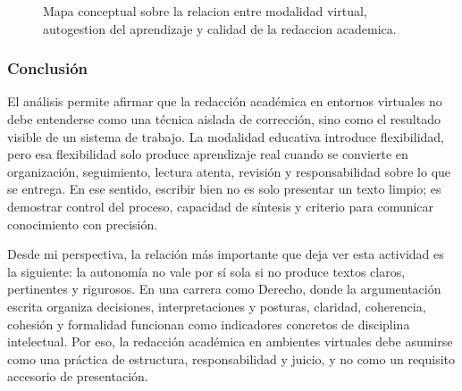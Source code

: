 \begin{landscape}
\begin{figure}[p]
{
}%
\caption{Mapa conceptual sobre la relacion entre modalidad virtual, autogestion del aprendizaje y calidad de la redaccion academica.}
\label{fig:mapa-conceptual-redaccion-portafolio}
\end{figure}
\end{landscape}
\endgroup
\clearpage

\subsubsection{Conclusión}

El análisis permite afirmar que la redacción académica en entornos virtuales no debe entenderse como una técnica aislada de corrección, sino como el resultado visible de un sistema de trabajo. La modalidad educativa introduce flexibilidad, pero esa flexibilidad solo produce aprendizaje real cuando se convierte en organización, seguimiento, lectura atenta, revisión y responsabilidad sobre lo que se entrega. En ese sentido, escribir bien no es solo presentar un texto limpio; es demostrar control del proceso, capacidad de síntesis y criterio para comunicar conocimiento con precisión.

Desde mi perspectiva, la relación más importante que deja ver esta actividad es la siguiente: la autonomía no vale por sí sola si no produce textos claros, pertinentes y rigurosos. En una carrera como Derecho, donde la argumentación escrita organiza decisiones, interpretaciones y posturas, claridad, coherencia, cohesión y formalidad funcionan como indicadores concretos de disciplina intelectual. Por eso, la redacción académica en ambientes virtuales debe asumirse como una práctica de estructura, responsabilidad y juicio, y no como un requisito accesorio de presentación.
